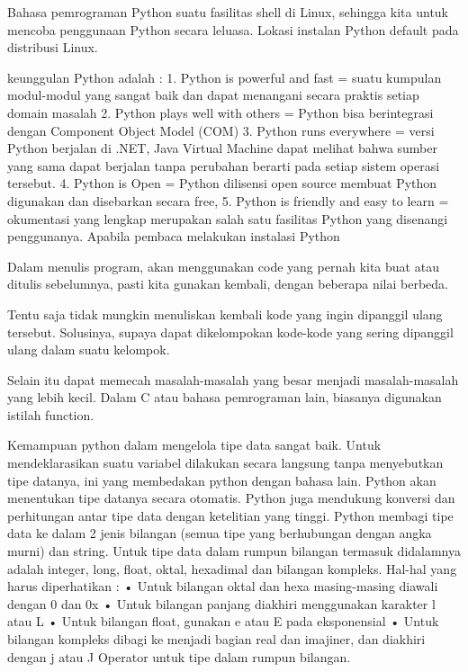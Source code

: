 Bahasa pemrograman Python suatu fasilitas  shell di Linux, sehingga kita untuk mencoba penggunaan
Python secara leluasa. Lokasi instalan Python default pada distribusi Linux.

keunggulan Python adalah :
1. Python is powerful and fast = suatu kumpulan modul-modul yang sangat baik dan dapat menangani secara praktis setiap domain masalah
2. Python plays well with others = Python bisa berintegrasi dengan Component Object Model (COM) 
3. Python runs everywhere = versi Python berjalan di .NET, Java Virtual Machine dapat melihat bahwa sumber yang sama dapat berjalan tanpa perubahan berarti pada setiap sistem operasi tersebut.
4. Python is Open = Python dilisensi open source membuat Python digunakan dan disebarkan secara free,
5. Python is friendly and easy to learn = okumentasi yang lengkap merupakan salah satu fasilitas Python yang disenangi penggunanya. Apabila pembaca melakukan instalasi Python

Dalam menulis program, akan menggunakan code yang pernah kita  buat atau ditulis sebelumnya, pasti
kita gunakan kembali, dengan beberapa nilai berbeda.
 
Tentu saja tidak mungkin menuliskan kembali kode yang ingin dipanggil ulang tersebut.
Solusinya, supaya dapat dikelompokan kode-kode yang sering dipanggil ulang dalam suatu kelompok.

Selain itu dapat memecah masalah-masalah yang besar  menjadi masalah-masalah yang lebih kecil.
Dalam C atau bahasa pemrograman lain, biasanya digunakan istilah function.

Kemampuan python dalam mengelola tipe data sangat baik. Untuk mendeklarasikan suatu variabel dilakukan secara langsung tanpa menyebutkan tipe datanya, ini yang membedakan python dengan bahasa lain. Python akan menentukan tipe datanya secara otomatis. Python juga mendukung konversi dan perhitungan antar tipe data dengan ketelitian yang tinggi. Python membagi tipe data ke dalam 2 jenis bilangan (semua tipe yang berhubungan dengan angka murni) dan string. Untuk tipe data dalam rumpun bilangan termasuk didalamnya adalah integer, long, float, oktal, hexadimal dan bilangan kompleks. Hal-hal yang harus diperhatikan :
•	Untuk bilangan oktal dan hexa masing-masing diawali dengan 0 dan 0x
•	Untuk bilangan panjang diakhiri menggunakan karakter l atau L
•	Untuk bilangan float, gunakan e atau E pada eksponensial
•	Untuk bilangan kompleks dibagi ke menjadi bagian real dan imajiner, dan diakhiri dengan j atau J Operator untuk tipe dalam rumpun bilangan.\cite{utamipemrograman}

